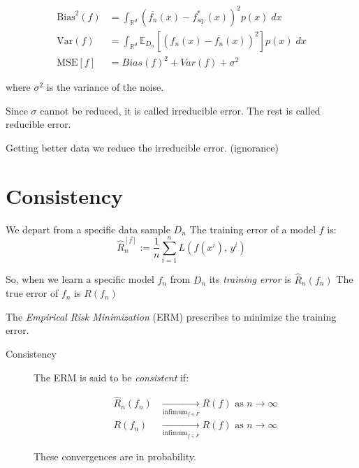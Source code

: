 \begin{align*}
	\text{Bias}^2(f) & = \int_{\mathds{R}^d} \left( \overline{f_n}(x) - f_{sq.}^*(x) \right)^2 p(x)\; dx                           \\
	\text{Var}(f)    & = \int_{\mathds{R}^d} \mathds{E}_{D_n} \left[ \left( f_n(x) - \overline{f_n}(x) \right)^2 \right] p(x)\; dx \\
	\text{MSE}[f]    & = Bias(f)^2 + Var(f) + \sigma^2
\end{align*}

where \(\sigma^2\) is the variance of the noise.

Since \(\sigma\) cannot be reduced, it is called irreducible error. The
rest is called reducible error.

Getting better data we reduce the irreducible error. (ignorance)

\section{Consistency}

We depart from a specific data sample \(D_n\) The training error of a
model \(f\) is:
\begin{equation*}
	\hat{R}_n^{[f]} := \frac{1}{n} \sum_{i=1}^n L(f(x^i),\, y^i)
\end{equation*}

So, when we learn a specific model \(f_n\) from \(D_n\) its
\emph{training error} is \(\hat{R}_n(f_n)\) The true error of \(f_n\)
is \(R(f_n)\)

The \emph{Empirical Risk Minimization} (ERM) prescribes to minimize the
training error.

\begin{description}
	\item[Consistency]
		The ERM is said to be \emph{consistent} if:

		\begin{align*}
			\hat{R}_n(f_n) & \xrightarrow[\text{infimum}_{f \in F}]{} R(f)
			\text{ as } n \rightarrow \infty                               \\
			R(f_n)         & \xrightarrow[\text{infimum}_{f \in F}]{} R(f)
			\text{ as } n \rightarrow \infty
		\end{align*}

		These convergences are in probability.
\end{description}

